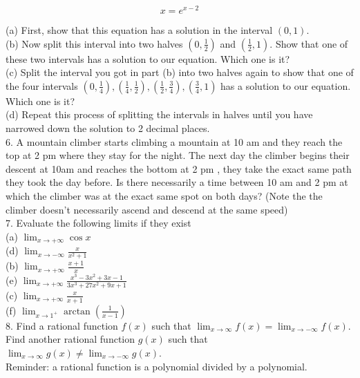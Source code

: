 \documentclass[10pt]{article}
\begin{document}
$$
x=e^{x-2}
$$

(a) First, show that this equation has a solution in the interval $(0,1)$.\\
(b) Now split this interval into two halves $\left(0, \frac{1}{2}\right)$ and $\left(\frac{1}{2}, 1\right)$. Show that one of these two intervals has a solution to our equation. Which one is it?\\
(c) Split the interval you got in part (b) into two halves again to show that one of the four intervals $\left(0, \frac{1}{4}\right),\left(\frac{1}{4}, \frac{1}{2}\right),\left(\frac{1}{2}, \frac{3}{4}\right),\left(\frac{3}{4}, 1\right)$ has a solution to our equation. Which one is it?\\
(d) Repeat this process of splitting the intervals in halves until you have narrowed down the solution to 2 decimal places.\\
6. A mountain climber starts climbing a mountain at 10 am and they reach the top at 2 pm where they stay for the night. The next day the climber begins their descent at 10am and reaches the bottom at 2 pm , they take the exact same path they took the day before. Is there necessarily a time between 10 am and 2 pm at which the climber was at the exact same spot on both days? (Note the the climber doesn't necessarily ascend and descend at the same speed)\\
7. Evaluate the following limits if they exist\\
(a) $\lim _{x \rightarrow+\infty} \cos x$\\
(d) $\lim _{x \rightarrow-\infty} \frac{x}{x^{2}+1}$\\
(b) $\lim _{x \rightarrow+\infty} \frac{x+1}{x}$\\
(e) $\lim _{x \rightarrow+\infty} \frac{x^{3}-3 x^{2}+3 x-1}{3 x^{3}+27 x^{2}+9 x+1}$\\
(c) $\lim _{x \rightarrow+\infty} \frac{x}{x+1}$\\
(f) $\lim _{x \rightarrow 1^{+}} \arctan \left(\frac{1}{x-1}\right)$\\
8. Find a rational function $f(x)$ such that $\lim _{x \rightarrow \infty} f(x)=\lim _{x \rightarrow-\infty} f(x)$. Find another rational function $g(x)$ such that $\lim _{x \rightarrow \infty} g(x) \neq \lim _{x \rightarrow-\infty} g(x)$.\\
Reminder: a rational function is a polynomial divided by a polynomial.
\end{document}
